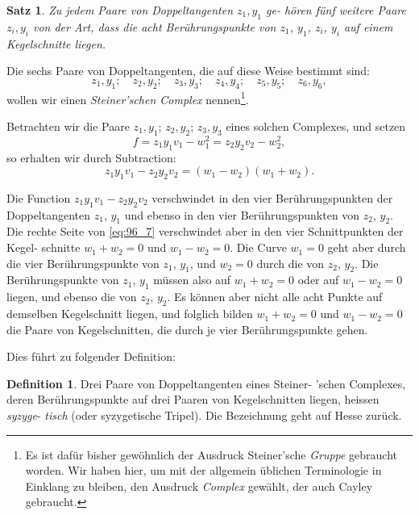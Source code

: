 \documentclass[12pt,a4paper]{article}
\theoremstyle{plain}
\newtheorem{satz}{Satz}[section]
\theoremstyle{definition}
\newtheorem{definition}{Definition}[section]
\theoremstyle{remark}
\begin{document}
\begin{satz}\label{satz:96_1}
Zu jedem Paare von Doppeltangenten $z_1, y_1$ ge-
hören fünf weitere Paare $z_i, y_i$ von der Art, dass
die acht Berührungspunkte von $z_1$, $y_1$, $z_i$, $y_i$ auf
einem Kegelschnitte liegen.
\end{satz}

Die sechs Paare von Doppeltangenten, die auf diese Weise
bestimmt sind:
\begin{equation*}
z_1, y_1; \quad z_2, y_2; \quad z_3, y_3; \quad z_4, y_4; \quad z_5, y_5; \quad z_6, y_6,
\end{equation*}
wollen wir einen \emph{Steiner'schen Complex} nennen\footnote{Es ist dafür bisher gewöhnlich der Ausdruck Steiner'sche
\emph{Gruppe} gebraucht worden. Wir haben hier, um mit der allgemein
üblichen Terminologie in Einklang zu bleiben, den Ausdruck \emph{Complex}
gewählt, der auch Cayley gebraucht.}.

Betrachten wir die Paare $z_1, y_1$; $z_2, y_2$; $z_3, y_3$ eines solchen
Complexes, und setzen
\begin{equation*}
f = z_1 y_1 v_1 - w_1^2 = z_2 y_2 v_2 - w_2^2,
\end{equation*}
so erhalten wir durch Subtraction:
\begin{equation}\label{eq:96_7}
z_1 y_1 v_1 - z_2 y_2 v_2 = (w_1 - w_2)(w_1 + w_2).
\end{equation}

Die Function $z_1 y_1 v_1 - z_2 y_2 v_2$ verschwindet in den vier
Berührungspunkten der Doppeltangenten $z_1$, $y_1$ und ebenso in
den vier Berührungspunkten von $z_2$, $y_2$. Die rechte Seite von
\eqref{eq:96_7} verschwindet aber in den vier Schnittpunkten der Kegel-
schnitte $w_1 + w_2 = 0$ und $w_1 - w_2 = 0$. Die Curve $w_1 = 0$
geht aber durch die vier Berührungspunkte von $z_1$, $y_1$, und
$w_2 = 0$ durch die von $z_2$, $y_2$. Die Berührungspunkte von $z_1$,
$y_1$ müssen also auf $w_1 + w_2 = 0$ oder auf $w_1 - w_2 = 0$ liegen,
und ebenso die von $z_2$, $y_2$. Es können aber nicht alle acht
Punkte auf demselben Kegelschnitt liegen, und folglich bilden
$w_1 + w_2 = 0$ und $w_1 - w_2 = 0$ die Paare von Kegelschnitten,
die durch je vier Berührungspunkte gehen.

Dies führt zu folgender Definition:

\begin{definition}
Drei Paare von Doppeltangenten eines Steiner-
'schen Complexes, deren Berührungspunkte auf drei
Paaren von Kegelschnitten liegen, heissen \emph{syzyge}-
\emph{tisch} (oder syzygetische Tripel). Die Bezeichnung
geht auf Hesse zurück.
\end{definition}
\end{document}
